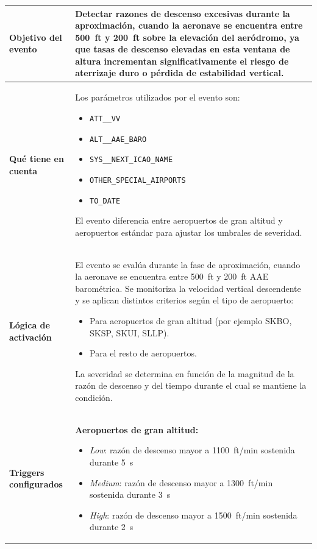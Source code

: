 \documentclass[11pt,a4paper]{article}
\begin{document}
	\renewcommand{\arraystretch}{1.3}
	\begin{longtable}{p{5cm} p{9.5cm}}
		\hline
		\textbf{Objetivo del evento} &
		Detectar razones de descenso excesivas durante la aproximación, cuando la aeronave se encuentra entre \SI{500}{ft} y \SI{200}{ft} sobre la elevación del aeródromo, ya que tasas de descenso elevadas en esta ventana de altura incrementan significativamente el riesgo de aterrizaje duro o pérdida de estabilidad vertical. \\
		\hline
		\textbf{Qué tiene en cuenta} &
		Los parámetros utilizados por el evento son:
		\begin{itemize}
			\item \texttt{ATT\_\_VV}
			\item \texttt{ALT\_\_AAE\_BARO}
			\item \texttt{SYS\_\_NEXT\_ICAO\_NAME}
			\item \texttt{OTHER\_SPECIAL\_AIRPORTS}
			\item \texttt{TO\_DATE}
		\end{itemize}
		El evento diferencia entre aeropuertos de gran altitud y aeropuertos estándar para ajustar los umbrales de severidad. \\
		\hline
		\textbf{Lógica de activación} &
		El evento se evalúa durante la fase de aproximación, cuando la aeronave se encuentra entre \SI{500}{ft} y \SI{200}{ft} AAE barométrica.
		Se monitoriza la velocidad vertical descendente y se aplican distintos criterios según el tipo de aeropuerto:
		\begin{itemize}
			\item Para aeropuertos de gran altitud (por ejemplo SKBO, SKSP, SKUI, SLLP).
			\item Para el resto de aeropuertos.
		\end{itemize}
		La severidad se determina en función de la magnitud de la razón de descenso y del tiempo durante el cual se mantiene la condición. \\
		\hline
		\textbf{Triggers configurados} &
		\textbf{Aeropuertos de gran altitud:}
		\begin{itemize}
			\item \textit{Low}: razón de descenso mayor a \SI{1100}{ft/min} sostenida durante \SI{5}{s}
			\item \textit{Medium}: razón de descenso mayor a \SI{1300}{ft/min} sostenida durante \SI{3}{s}
			\item \textit{High}: razón de descenso mayor a \SI{1500}{ft/min} sostenida durante \SI{2}{s}
		\end{itemize}

\end{longtable}
\end{document}
